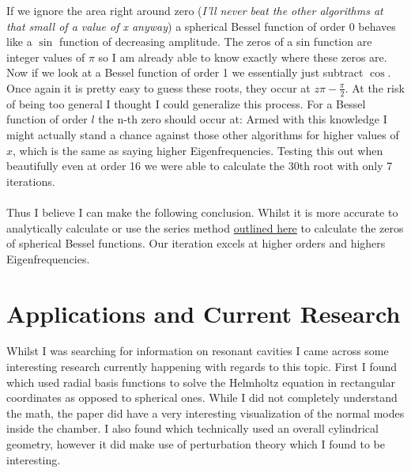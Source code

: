If we ignore the area right around zero (\emph{I'll never beat the other algorithms at that small of a value of x anyway}) a spherical Bessel function of order 0 behaves like a $\sin$ function of decreasing amplitude.
The zeros of a sin function are integer values of $\pi$ so I am already able to know exactly where these zeros are. Now if we look at a Bessel function of order 1 we essentially just subtract $\cos$.
Once again it is pretty easy to guess these roots, they occur at $z\pi-\frac{\pi}{2}$. At the risk of being too general I thought I could generalize this process. For a Bessel function of order $l$ the n-th zero should occur at:
Armed with this knowledge I might actually stand a chance against those other algorithms for higher values of $x$, which is the same as saying higher Eigenfrequencies. Testing this out when beautifully even at order 16 we were able to calculate the 30th root with only 7 iterations.\\
\\
Thus I believe I can make the following conclusion. Whilst it is more accurate to analytically calculate or use the series method \href{https://scipy-cookbook.readthedocs.io/items/SphericalBesselZeros.html}{outlined here} to calculate the zeros of spherical Bessel functions. Our iteration excels at higher orders and highers Eigenfrequencies. 

\section{Applications and Current Research}

Whilst I was searching for information on resonant cavities I came across some interesting research currently happening with regards to this topic. First I found \cite{research1} which used radial basis functions to solve the Helmholtz equation in rectangular coordinates as opposed to spherical ones. While I did not completely understand the math, the paper did have a very interesting visualization of the normal modes inside the chamber. I also found \cite{research2} which technically used an overall cylindrical geometry, however it did make use of perturbation theory which I found to be interesting.